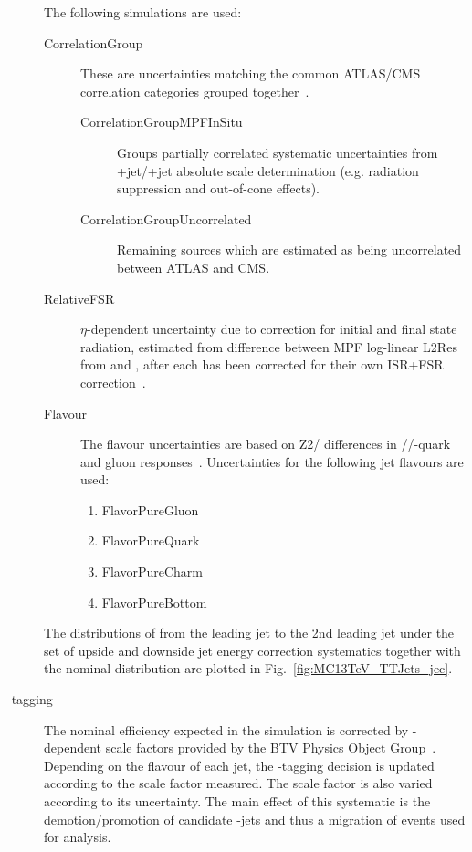 \begin{description}
The following simulations are used:
\begin{description}
        \item[CorrelationGroup] These are uncertainties matching the common ATLAS/CMS correlation categories grouped together~\cite{twiki:JESUS}. 
        \begin{description}                     
              \item[CorrelationGroupMPFInSitu] Groups partially correlated systematic uncertainties from \cPZ+jet/\cPgg+jet absolute scale determination (e.g. radiation suppression and out-of-cone effects).
              \item[CorrelationGroupUncorrelated] Remaining sources which are estimated as being uncorrelated between ATLAS and CMS.
        \end{description}
        \item[RelativeFSR] $\eta$-dependent uncertainty due to correction for initial and final state radiation, estimated from difference between MPF log-linear L2Res from  and \HERWIGpp, after each has been corrected for their own ISR+FSR correction~\cite{Khachatryan:2016kdb}.
        \item[Flavour]  The flavour uncertainties are based on  Z2/ differences in \cPqu\cPqd\cPqs/\cPqc/\cPqb-quark and gluon responses~\cite{Khachatryan:2016kdb}. Uncertainties for the following jet flavours are used:
        \begin{enumerate}
                \item FlavorPureGluon
                \item FlavorPureQuark
                \item FlavorPureCharm
                \item FlavorPureBottom
        \end{enumerate}
\end{description}

The distributions of \pullangle from the leading jet \leadingjet to the 2nd leading jet \scndleadingjet under the set of upside and downside jet energy correction systematics together with the nominal distribution are plotted in Fig.~\ref{fig:MC13TeV_TTJets_jec}.

\item[\cPqb-tagging] The nominal efficiency expected in the simulation is corrected by \pt-dependent scale factors provided by the BTV Physics Object Group~\cite{twiki:BTV}. Depending on the flavour of each jet, the \cPqb-tagging decision is updated according to the scale factor measured. The scale factor is also varied according to its uncertainty. The main effect of this systematic is the demotion/promotion of candidate \cPqb-jets and thus a migration of events used for analysis.


\end{description}
